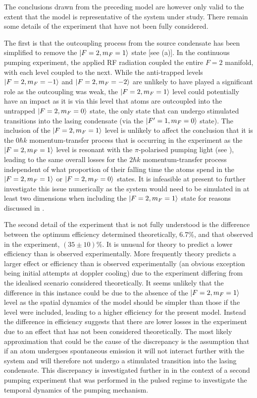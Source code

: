 The conclusions drawn from the preceding model are however only valid to the extent that the model is representative of the system under study.  There remain some details of the experiment that have not been fully considered.

The first is that the outcoupling process from the source condensate has been simplified to remove the ${\left|F=2, m_F = 1\right>}$ state [see (a)].  In the continuous pumping experiment, the applied RF radiation coupled the entire $F=2$ manifold, with each level coupled to the next.  While the anti-trapped levels ${\left|F=2, m_F=-1\right>}$ and ${\left|F=2, m_F=-2\right>}$ are unlikely to have played a significant role as the outcoupling was weak, the ${\left|F=2, m_F=1\right>}$ level could potentially have an impact as it is via this level that atoms are outcoupled into the untrapped ${\left|F=2, m_F=0\right>}$ state, the only state that can undergo stimulated transitions into the lasing condensate (via the ${\left|F'=1, m_F=0\right>}$ state).  The inclusion of the ${\left|F=2, m_F=1\right>}$ level is unlikely to affect the conclusion that it is the $0 \hbar k$ momentum-transfer process that is occurring in the experiment as the ${\left|F=2, m_F=1\right>}$ level is resonant with the $\pi$-polarised pumping light (see ), leading to the same overall losses for the $2 \hbar k$ momentum-transfer process independent of what proportion of their falling time the atoms spend in the ${\left|F=2, m_F=1\right>}$ or ${\left|F=2, m_F=0\right>}$ states.  It is infeasible at present to further investigate this issue numerically as the system would need to be simulated in at least two dimensions when including the ${\left|F=2, m_F=1\right>}$ state for reasons discussed in .

The second detail of the experiment that is not fully understood is the difference between the optimum efficiency determined theoretically, 6.7\%, and that observed in the experiment, $(35\pm 10)\%$.  It is unusual for theory to predict a lower efficiency than is observed experimentally.  More frequently theory predicts a larger effect or efficiency than is observed experimentally (an obvious exception being initial attempts at doppler cooling) due to the experiment differing from the idealised scenario considered theoretically.  It seems unlikely that the difference in this instance could be due to the absence of the ${\left|F=2, m_F=1\right>}$ level as the spatial dynamics of the model should be simpler than those if the level were included, leading to a higher efficiency for the present model.  Instead the difference in efficiency suggests that there are lower losses in the experiment due to an effect that has not been considered theoretically.  The most likely approximation that could be the cause of the discrepancy is the assumption that if an atom undergoes spontaneous emission it will not interact further with the system and will therefore not undergo a stimulated transition into the lasing condensate.  This discrepancy is investigated further in  in the context of a second pumping experiment that was performed in the pulsed regime to investigate the temporal dynamics of the pumping mechanism.

